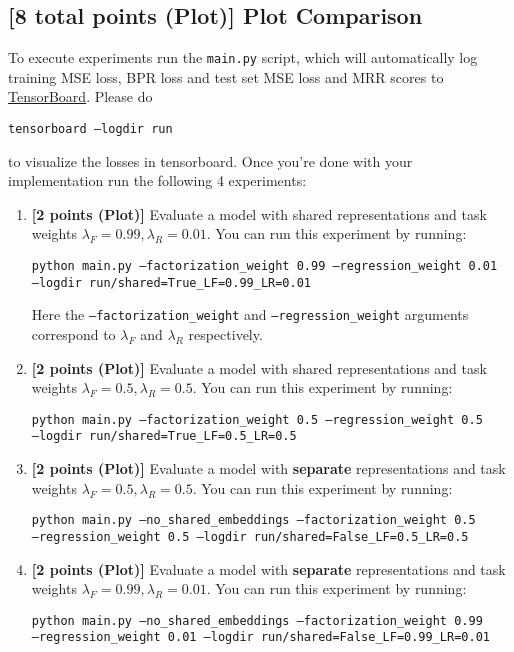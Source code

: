 \documentclass[12pt]{article}
\begin{document}
\subsection{\textbf{[8 total points (Plot)]} Plot Comparison}
To execute experiments run the \texttt{main.py} script, which will automatically log training MSE loss, BPR loss and test set MSE loss and MRR scores to \href{https://pytorch.org/docs/stable/tensorboard.html}{TensorBoard}. 
Please do 

\texttt{tensorboard --logdir run} 

\noindent to visualize the losses in tensorboard.
Once you're done with your implementation run the following 4 experiments:

\begin{enumerate}
    \item \textbf{[2 points (Plot)]} Evaluate a model with shared representations and task weights $\lambda_F=0.99, \lambda_R=0.01$. You can run this experiment by running:
    
    \texttt{python main.py --factorization\_weight 0.99 --regression\_weight 0.01 \\--logdir run/shared=True\_LF=0.99\_LR=0.01}
    
    Here the \texttt{--factorization\_weight} and \texttt{--regression\_weight} arguments correspond to $\lambda_F$ and  $\lambda_R$ respectively.
    
    \item \textbf{[2 points (Plot)]} Evaluate a model with shared representations and task weights $\lambda_F=0.5, \lambda_R=0.5$. You can run this experiment by running:    
    
    \texttt{python main.py --factorization\_weight 0.5 --regression\_weight 0.5 \\--logdir run/shared=True\_LF=0.5\_LR=0.5}
    
    \item \textbf{[2 points (Plot)]} Evaluate a model with \textbf{separate} representations and task weights $\lambda_F=0.5, \lambda_R=0.5$. You can run this experiment by running:    
    
    \texttt{python main.py --no\_shared\_embeddings --factorization\_weight 0.5 \\ --regression\_weight 0.5 --logdir run/shared=False\_LF=0.5\_LR=0.5}
    
     \item \textbf{[2 points (Plot)]} Evaluate a model with \textbf{separate} representations and task weights $\lambda_F=0.99, \lambda_R=0.01$. You can run this experiment by running:    
    
    \texttt{python main.py --no\_shared\_embeddings --factorization\_weight 0.99 \\ --regression\_weight 0.01 --logdir run/shared=False\_LF=0.99\_LR=0.01}
    
\end{enumerate}
\end{document}
